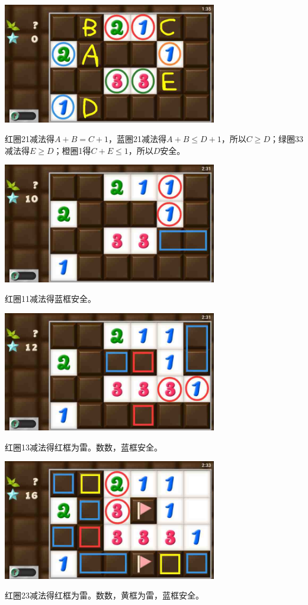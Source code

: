 \subsection{} %
\begin{center}
    \includegraphics[width=0.7\textwidth]{puzzlelow/205-1.jpg}
\end{center}
红圈21减法得$A+B=C+1$，蓝圈21减法得$A+B\le D+1$，所以$C\ge D$；绿圈33减法得$E\ge D$；橙圈1得$C+E\le 1$，所以$D$安全。
\begin{center}
    \includegraphics[width=0.7\textwidth]{puzzlelow/205-2.jpg}
\end{center}
红圈11减法得蓝框安全。
\begin{center}
    \includegraphics[width=0.7\textwidth]{puzzlelow/205-3.jpg}
\end{center}
红圈13减法得红框为雷。数数，蓝框安全。
\begin{center}
    \includegraphics[width=0.7\textwidth]{puzzlelow/205-4.jpg}
\end{center}
红圈23减法得红框为雷。数数，黄框为雷，蓝框安全。


